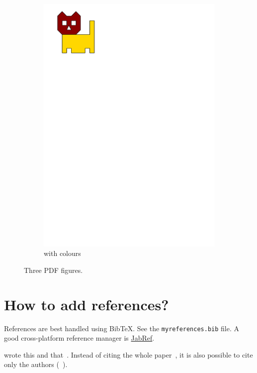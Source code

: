 \begin{figure}
\begin{subfigure}[b]{0.28\linewidth}
    \includegraphics[page=3,width=\linewidth]{figs/tricat.pdf}
    \caption{with colours}\label{fig:pdffig:3}
  \end{subfigure}%
  \caption{Three PDF figures.}
\label{fig:pdffig}
\end{figure}


%
\section{How to add references?}

References are best handled using Bib\TeX.
See the \texttt{myreferences.bib} file. 
A good cross-platform reference manager is \href{http://jabref.sourceforge.net/}{JabRef}.

\citet{Fernandez-Godino2016} wrote this and that~\citep{Fernandez-Godino2016,Bonfiglio2019}.
Instead of citing the whole paper~\citep{Bonfiglio2019}, it is also possible to cite only the authors (\eg\ \citeauthor{Bonfiglio2019}).

